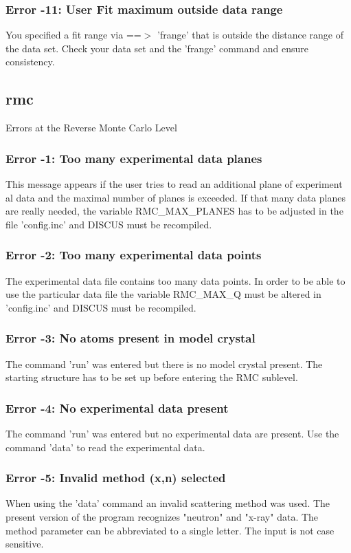 \subsubsection{Error -11: User Fit maximum outside data range}
\par
You specified a fit range via ==$> $ 'frange' that is outside the 
distance range of the data set. Check your data set and the 'frange' 
command and ensure consistency. 
\subsection*{rmc}
Errors at the Reverse Monte Carlo Level 
\par
\subsubsection{Error -1: Too many experimental data planes}
\par
This message appears if the user tries to read an additional plane of 
experiment al data and the maximal number of planes is exceeded. If that 
many data planes are really needed, the variable RMC\_MAX\_PLANES has to 
be adjusted in the file 'config.inc' and DISCUS must be recompiled. 
\subsubsection{Error -2: Too many experimental data points}
\par
The experimental data file contains too many data points. In order to 
be able to use the particular data file the variable RMC\_MAX\_Q must 
be altered in 'config.inc' and DISCUS must be recompiled. 
\subsubsection{Error -3: No atoms present in model crystal}
\par
The command 'run' was entered but there is no model crystal present. 
The starting structure has to be set up before entering the RMC sublevel. 
\subsubsection{Error -4: No experimental data present}
\par
The command 'run' was entered but no experimental data are present. 
Use the command 'data' to read the experimental data. 
\subsubsection{Error -5: Invalid method (x,n) selected}
\par
When using the 'data' command an invalid scattering method was used. 
The present version of the program recognizes "neutron" and "x-ray" data. 
The method parameter can be abbreviated to a single letter. The input 
is not case sensitive. 
